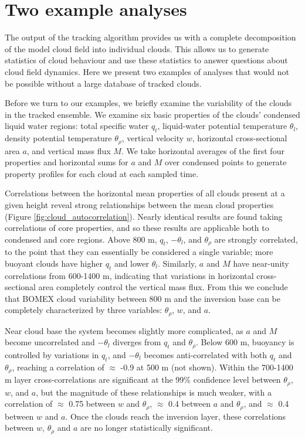\documentclass[acp]{copernicus}
\begin{document}

\section{Two example analyses}

The output of the tracking algorithm provides us with a complete decomposition 
of the model cloud field into individual clouds.  This allows us to generate 
statistics of cloud behaviour and use these statistics to answer questions 
about cloud field dynamics.  Here we present two examples of analyses that 
would not be possible without a large database of tracked clouds.

Before we turn to our examples, we briefly examine the variability of the 
clouds in the tracked ensemble.  We examine six basic properties of the 
clouds' condensed liquid water regions: total specific water $q_t$, 
liquid-water potential temperature $\theta_l$, density potential temperature 
$\theta_\rho$, vertical velocity $w$, horizontal cross-sectional area $a$, 
and vertical mass flux $M$.  We take horizontal averages of the first four 
properties and horizontal sums for $a$ and $M$ over condensed points to 
generate property profiles for each cloud at each sampled time.

Correlations between the horizontal mean properties of all clouds present at a 
given height reveal strong relationships between the mean cloud properties 
(Figure \ref{fig:cloud_autocorrelation}).  Nearly identical results are found 
taking correlations of core properties, and so these results are applicable 
both to condensed and core regions.  Above 800 m, $q_t$, $-\theta_l$, and 
$\theta_\rho$ are strongly correlated, to the point that they can essentially 
be considered a single variable; more buoyant clouds have higher $q_t$ and 
lower $\theta_l$.  Similarly, $a$ and $M$ have near-unity correlations from 
600-1400 m, indicating that variations in horizontal cross-sectional area 
completely control the vertical mass flux.  From this we conclude that BOMEX 
cloud variability between 800 m and the inversion base can be completely 
characterized by three variables: $\theta_\rho$, $w$, and $a$.

Near cloud base the system becomes slightly more complicated, as $a$ and $M$ 
become uncorrelated and $-\theta_l$ diverges from $q_t$ and $\theta_\rho$.  
Below 600 m, buoyancy is controlled by variations in $q_t$, and $-\theta_l$ 
becomes anti-correlated with both $q_t$ and $\theta_\rho$, reaching a 
correlation of $\approx$ -0.9 at 500 m (not shown).  Within the 700-1400 m 
layer cross-correlations are significant at the 99\% confidence level between 
$\theta_\rho$, $w$, and $a$, but the magnitude of these relationships is much 
weaker, with a correlation of $\approx$ 0.75 between $w$ and $\theta_\rho$, 
$\approx$ 0.4 between $a$ and $\theta_\rho$, and $\approx$ 0.4 between $w$ 
and $a$.  Once the clouds reach the inversion layer, these correlations between 
$w$, $\theta_\rho$ and $a$ are no longer statistically significant.
\end{document}
